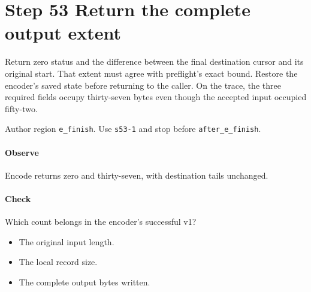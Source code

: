 \section{Step 53 Return the complete output extent}\label{cbor-s53}
Return zero status and the difference between the final destination cursor and its original start. That extent must agree with preflight's exact bound. Restore the encoder's saved state before returning to the caller. On the trace, the three required fields occupy thirty-seven bytes even though the accepted input occupied fifty-two.

Author region \texttt{e\_finish}. Use \texttt{s53-1} and stop before \texttt{after\_e\_finish}.

\paragraph{Observe} Encode returns zero and thirty-seven, with destination tails unchanged.

\paragraph{Check} Which count belongs in the encoder's successful v1?
\begin{itemize}
  \item[A.] The original input length.
  \item[B.] The local record size.
  \item[C.] The complete output bytes written.
\end{itemize}
